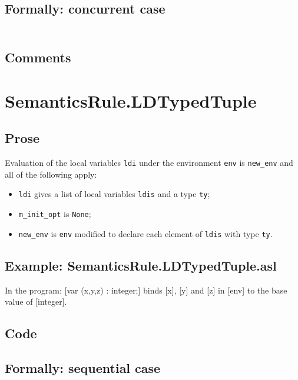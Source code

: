 \documentclass{book}
\begin{document}
  \subsection{Formally: concurrent case}
  \begin{align}
  \end{align} 

    \subsection{Comments}

\section{SemanticsRule.LDTypedTuple \label{sec:SemanticsRule.LDTypedTuple}}

    \subsection{Prose}
Evaluation of the local variables \texttt{ldi} under the environment
\texttt{env} is \texttt{new\_env} and all of the following apply:
    \begin{itemize}
    \item \texttt{ldi} gives a list of local variables \texttt{ldis} and a type \texttt{ty};
    \item \texttt{m\_init\_opt} is \texttt{None};
    \item \texttt{new\_env} is \texttt{env} modified to declare each element of \texttt{ldis} with type \texttt{ty}.
    \end{itemize}

    \subsection{Example: SemanticsRule.LDTypedTuple.asl}
    In the program:
    [var (x,y,z) : integer;] binds [x], [y] and [z] in [env] to the base value
    of [integer].

  \subsection{Code}

  \subsection{Formally: sequential case}
  \begin{align}
  \end{align} 
\end{document}
